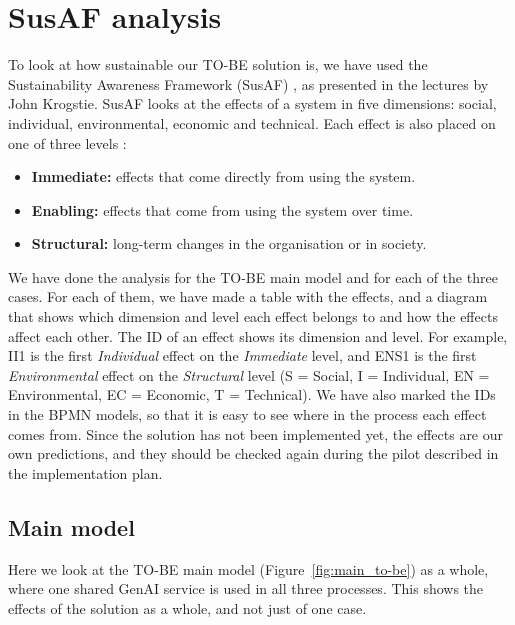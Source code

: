 
\section{SusAF analysis}\label{sec:susaf}
\label{sec:susaf}

To look at how sustainable our TO-BE solution is, we have used the Sustainability Awareness Framework (SusAF) \parencite{duboc2020}, as presented in the lectures by John Krogstie. SusAF looks at the effects of a system in five dimensions: social, individual, environmental, economic and technical. Each effect is also placed on one of three levels \parencite{becker2016}:

\begin{itemize}
    \item \textbf{Immediate:} effects that come directly from using the system.
    \item \textbf{Enabling:} effects that come from using the system over time.
    \item \textbf{Structural:} long-term changes in the organisation or in society.
\end{itemize}

We have done the analysis for the TO-BE main model and for each of the three cases. For each of them, we have made a table with the effects, and a diagram that shows which dimension and level each effect belongs to and how the effects affect each other. The ID of an effect shows its dimension and level. For example, II1 is the first \textit{Individual} effect on the \textit{Immediate} level, and ENS1 is the first \textit{Environmental} effect on the \textit{Structural} level (S = Social, I = Individual, EN = Environmental, EC = Economic, T = Technical). We have also marked the IDs in the BPMN models, so that it is easy to see where in the process each effect comes from. Since the solution has not been implemented yet, the effects are our own predictions, and they should be checked again during the pilot described in the implementation plan.

\subsection{Main model}
\label{subsec:susaf-main}

Here we look at the TO-BE main model (Figure~\ref{fig:main_to-be}) as a whole, where one shared GenAI service is used in all three processes. This shows the effects of the solution as a whole, and not just of one case.

